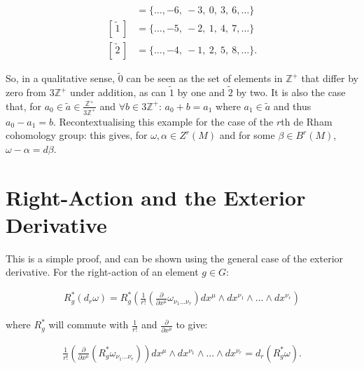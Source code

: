 \documentclass[fleqn, twocolumn, 10pt]{article}
\begin{document}
\begin{ceqn}
\begin{align*}
[\,\widetilde{0}\,] &= \{\ldots, -6,\:-3,\:0,\:3,\:6, \ldots\} \\
[\,\widetilde{1}\,] &= \{\ldots, -5,\:-2,\:1,\:4,\:7, \ldots\} \\
[\,\widetilde{2}\,] &= \{\ldots, -4,\:-1,\:2,\:5,\:8, \ldots\}.
\end{align*}
\end{ceqn}
So, in a qualitative sense, $\widetilde{0}$ can be seen as the set of elements in $\mathbb{Z}^+$ that differ by zero from $3\mathbb{Z}^+$ under addition, as can $\widetilde{1}$ by one and $\widetilde{2}$ by two. It is also the case that, for $a_0 \in \widetilde{a} \in \frac{\mathbb{Z}^+}{3\mathbb{Z}^+}$ and $\forall b \in 3\mathbb{Z}^+$: $a_0 + b = a_1$ where $a_1 \in \widetilde{a}$ and thus $a_0 - a_1 = b$. Recontextualising this example for the case of the $r$th de Rham cohomology group: this gives, for $\omega, \alpha \in Z^r(M)$ and for some $\beta \in B^r(M)$, $\omega - \alpha = d\beta$. 

\section{Right-Action and the Exterior Derivative}

This is a simple proof, and can be shown using the general case of the exterior derivative. For the right-action of an element $g \in G$:

\begin{ceqn}
\begin{align*}
R^\ast_g(d_r\omega) = R^\ast_g\left(\frac{1}{r!}\left(\frac{\partial}{\partial x^\mu}\omega_{\nu_1...\nu_r}\right) dx^\mu \land dx^{\nu_1} \land ... \land dx^{\nu_r}\right)
\end{align*}
\end{ceqn}
where $R^\ast_g$ will commute with $\frac{1}{r!}$ and $\frac{\partial}{\partial x^\mu}$ to give:

\begin{ceqn}
\begin{align*}
\frac{1}{r!}\left(\frac{\partial}{\partial x^\mu}(R^\ast_g\omega_{\nu_1...\nu_r})\right) dx^\mu \land dx^{\nu_1} \land ... \land dx^{\nu_r} = d_r(R^\ast_g\omega). 
\end{align*}
\end{ceqn}


\end{document}
